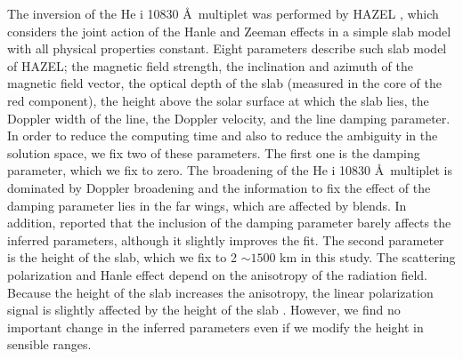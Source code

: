 \documentclass[manuscript]{aastex61}
\def\vector#1{\mbox{\boldmath $#1$}}
\begin{document}
The inversion of the He {\sc i} 10830 \AA\ multiplet was performed by HAZEL
\citep{2008ApJ...683..542A}, which considers the joint action of the Hanle and
Zeeman effects in a simple slab model with all physical properties constant.
Eight parameters describe such slab model of HAZEL;
the magnetic field strength, the inclination and azimuth of the magnetic field
vector, the optical depth of the slab (measured in the core of the red component), 
the height above the solar surface at which the slab lies, the Doppler width of the line,
the Doppler velocity, and the line damping parameter.
In order to reduce the computing time and also to reduce the ambiguity in the solution
space, we fix two of these parameters.
The first one is the damping parameter, which we fix to zero.
The broadening of the He {\sc i} 10830 \AA \ multiplet is dominated by Doppler broadening and the information
to fix the effect of the damping parameter lies in the far wings, which are affected by blends. 
In addition,  \cite{2004A&A...414.1109L} reported that the inclusion of the damping parameter barely affects the
inferred parameters, although it slightly improves the fit.
The second parameter is the height of the slab, which we fix to 2 \arcsec $\sim 1500$ km in this study.
The scattering polarization and Hanle effect depend on the anisotropy of the radiation field.
Because the height of the slab increases the anisotropy, the linear polarization signal is slightly 
affected by the height of the slab \citep{2011A&A...532A..63M}. However, we find no important change in the
inferred parameters even if we modify the height in sensible ranges.
\end{document}
